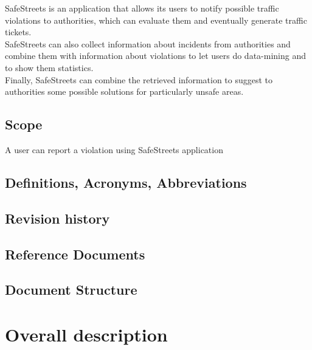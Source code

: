 \documentclass{article}
\begin{document}
	SafeStreets is an application that allows its users to notify possible traffic violations to authorities, which can evaluate them and eventually generate traffic tickets.\\
	SafeStreets can also collect information about incidents from authorities and combine them with information about violations to let users do data-mining and to show them statistics.\\
	Finally, SafeStreets can combine the retrieved information to suggest to authorities some possible solutions for particularly unsafe areas.\\
	
	\subsection{Scope}
	A user can report a violation using SafeStreets application
	
	\subsection{Definitions, Acronyms, Abbreviations}
	\subsection{Revision history}
	\subsection{Reference Documents}
	\subsection{Document Structure}
	
	\newpage
	\section{Overall description}
\end{document}
